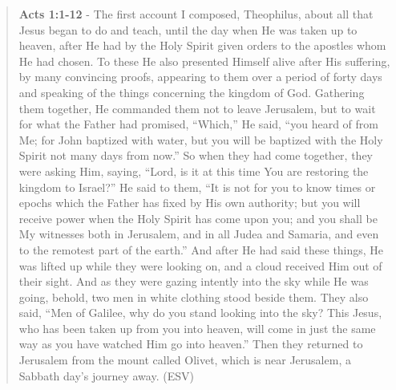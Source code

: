\documentclass[11pt]{article}
\begin{document}
\begin{quote}
\textbf{Acts 1:1-12} - The first account I composed, Theophilus, about all that Jesus began to do and teach, until the day when He was taken up to heaven, after He had by the Holy Spirit given orders to the apostles whom He had chosen. To these He also presented Himself alive after His suffering, by many convincing proofs, appearing to them over a period of forty days and speaking of the things concerning the kingdom of God. Gathering them together, He commanded them not to leave Jerusalem, but to wait for what the Father had promised, “Which,” He said, “you heard of from Me; for John baptized with water, but you will be baptized with the Holy Spirit not many days from now.” So when they had come together, they were asking Him, saying, “Lord, is it at this time You are restoring the kingdom to Israel?” He said to them, “It is not for you to know times or epochs which the Father has fixed by His own authority; but you will receive power when the Holy Spirit has come upon you; and you shall be My witnesses both in Jerusalem, and in all Judea and Samaria, and even to the remotest part of the earth.” And after He had said these things, He was lifted up while they were looking on, and a cloud received Him out of their sight. And as they were gazing intently into the sky while He was going, behold, two men in white clothing stood beside them. They also said, “Men of Galilee, why do you stand looking into the sky? This Jesus, who has been taken up from you into heaven, will come in just the same way as you have watched Him go into heaven.” Then they returned to Jerusalem from the mount called Olivet, which is near Jerusalem, a Sabbath day’s journey away. (ESV)
\end{quote}
\end{document}

